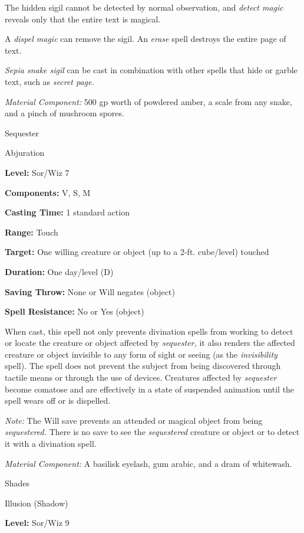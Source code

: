 \documentclass{article}
\begin{document}
The hidden sigil cannot be detected by normal observation, and \textit{detect magic 
}reveals only that the entire text is magical.

A \textit{dispel magic }can remove the sigil. An \textit{erase }spell destroys 
the entire page of text.

\textit{Sepia snake sigil }can be cast in combination with other spells that hide 
or garble text, such as \textit{secret page.}

\textit{Material Component: }500 gp worth of powdered amber, a scale from any snake, 
and a pinch of mushroom spores.

\vspace{12pt}
Sequester

Abjuration

\textbf{Level:} Sor/Wiz 7

\textbf{Components:} V, S, M

\textbf{Casting Time:} 1 standard action

\textbf{Range:} Touch

\textbf{Target:} One willing creature or object (up to a 2-ft. cube/level) touched

\textbf{Duration:} One day/level (D)

\textbf{Saving Throw:} None or Will negates (object)

\textbf{Spell Resistance:} No or Yes (object)

When cast, this spell not only prevents divination spells from working to detect 
or locate the creature or object affected by \textit{sequester, }it also renders 
the affected creature or object invisible to any form of sight or seeing (as the 
\textit{invisibility }spell). The spell does not prevent the subject from being 
discovered through tactile means or through the use of devices. Creatures affected 
by \textit{sequester }become comatose and are effectively in a state of suspended 
animation until the spell wears off or is dispelled.

\textit{Note: }The Will save prevents an attended or magical object from being 
\textit{sequestered. }There is no save to see the \textit{sequestered }creature 
or object or to detect it with a divination spell.

\textit{Material Component: }A basilisk eyelash, gum arabic, and a dram of whitewash.

\vspace{12pt}
Shades

Illusion (Shadow)

\textbf{Level:} Sor/Wiz 9
\end{document}
